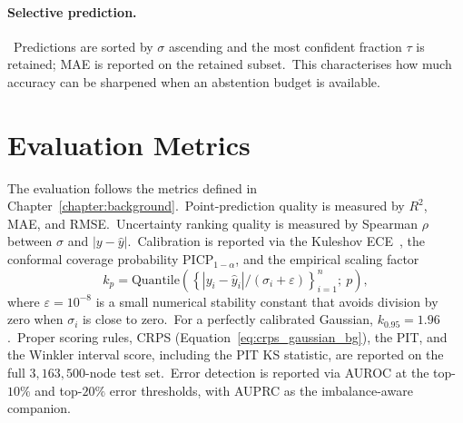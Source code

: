 \paragraph{Selective prediction.}\ Predictions are sorted by $\sigma$ ascending and the most confident fraction $\tau$ is retained; MAE is reported on the retained subset.\ This characterises how much accuracy can be sharpened when an abstention budget is available.

\section{Evaluation Metrics}\label{sec:metrics}

The evaluation follows the metrics defined in Chapter~\ref{chapter:background}.\ Point-prediction quality is measured by $R^2$, MAE, and RMSE.\ Uncertainty ranking quality is measured by Spearman $\rho$ between $\sigma$ and $|y - \hat y|$.\ Calibration is reported via the Kuleshov ECE~\cite{kuleshov2018accurate}, the conformal coverage probability $\mathrm{PICP}_{1-\alpha}$, and the empirical scaling factor
\begin{equation}\label{eq:kp}
 k_p = \mathrm{Quantile}\!\left(\left\{|y_i - \hat y_i|/(\sigma_i + \varepsilon)\right\}_{i=1}^{n};\ p\right),
\end{equation}
where $\varepsilon = 10^{-8}$ is a small numerical stability constant that avoids division by zero when $\sigma_i$ is close to zero.\ For a perfectly calibrated Gaussian, $k_{0.95} = 1.96$.\ Proper scoring rules, CRPS (Equation~\eqref{eq:crps_gaussian_bg}), the PIT, and the Winkler interval score, including the PIT KS statistic, are reported on the full $3{,}163{,}500$-node test set.\ Error detection is reported via AUROC at the top-$10\%$ and top-$20\%$ error thresholds, with AUPRC as the imbalance-aware companion.
